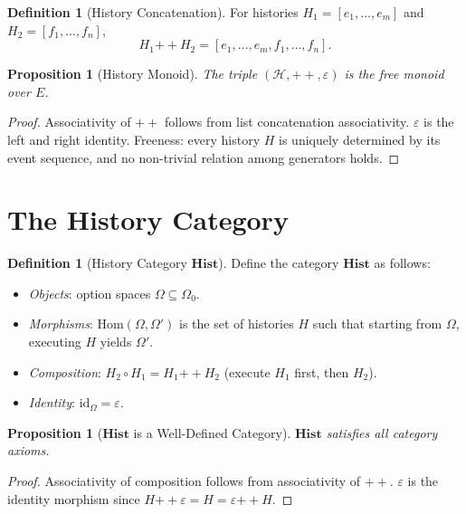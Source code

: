 \documentclass[12pt, a4paper, openany]{book}
\theoremstyle{plain}
\newtheorem{proposition}[theorem]{Proposition}
\theoremstyle{definition}
\newtheorem{definition}[theorem]{Definition}
\theoremstyle{remark}
\newcommand{\Hist}{\mathbf{Hist}}
\newcommand{\calH}{\mathcal{H}}
\begin{document}
\begin{definition}[History Concatenation]
For histories $H_1 = [e_1, \ldots, e_m]$ and $H_2 = [f_1, \ldots, f_n]$,
\[
H_1 \mathbin{++} H_2 = [e_1, \ldots, e_m, f_1, \ldots, f_n].
\]
\end{definition}

\begin{proposition}[History Monoid]
The triple $(\calH, \mathbin{++}, \varepsilon)$ is the free monoid over $E$.
\end{proposition}

\begin{proof}
Associativity of $\mathbin{++}$ follows from list concatenation associativity.
$\varepsilon$ is the left and right identity. Freeness: every history $H$ is
uniquely determined by its event sequence, and no non-trivial relation among
generators holds.
\end{proof}

\section{The History Category}

\begin{definition}[History Category $\Hist$]
Define the category $\Hist$ as follows:
\begin{itemize}
\item \textit{Objects}: option spaces $\Omega \subseteq \Omega_0$.
\item \textit{Morphisms}: $\mathrm{Hom}(\Omega, \Omega')$ is the set of histories
$H$ such that starting from $\Omega$, executing $H$ yields $\Omega'$.
\item \textit{Composition}: $H_2 \circ H_1 = H_1 \mathbin{++} H_2$ (execute
$H_1$ first, then $H_2$).
\item \textit{Identity}: $\mathrm{id}_\Omega = \varepsilon$.
\end{itemize}
\end{definition}

\begin{proposition}[$\Hist$ is a Well-Defined Category]
$\Hist$ satisfies all category axioms.
\end{proposition}

\begin{proof}
Associativity of composition follows from associativity of $\mathbin{++}$.
$\varepsilon$ is the identity morphism since $H \mathbin{++} \varepsilon = H =
\varepsilon \mathbin{++} H$.
\end{proof}
\end{document}
